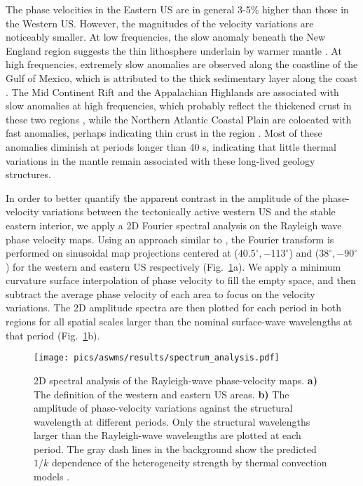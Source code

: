 The phase velocities in the Eastern US are in general 3-5\% higher than those in the Western US. However, the magnitudes of the velocity variations are noticeably smaller. 
At low frequencies, the slow anomaly beneath the New England region suggests the thin lithosphere underlain by warmer mantle \citep[e.g.,][]{Li:2002el,Gaherty:2004is,Rychert:2005cc}.
At high frequencies, extremely slow anomalies are observed along the coastline of the Gulf of Mexico, which is attributed to the thick sedimentary layer along the coast \citep{Laske:1997ug}. The Mid Continent Rift and the Appalachian Highlands are associated with slow anomalies at high frequencies, which probably reflect the thickened crust in these two regions \citep{Crotwell:2005iu,Shen:2013dd,Parker:2013ku}, while the Northern Atlantic Coastal Plain are colocated with fast anomalies, perhaps indicating thin crust in the region \citep{Crotwell:2005iu}. 
Most of these anomalies diminish at periods longer than 40 s, indicating that little thermal variations in the mantle remain associated with these long-lived geology structures. 


In order to better quantify the apparent contrast in the amplitude of the phase-velocity variations between the tectonically active western US and the stable eastern interior, 
we apply a 2D Fourier spectral analysis on the Rayleigh wave phase velocity maps. 
Using an approach similar to \citet{Chevrot:1998hm}, the Fourier transform is performed on sinusoidal map projections centered at ($40.5^\circ,-113^\circ$) and ($38^\circ,-90^\circ$) for the western and eastern US respectively (Fig.~\ref{fig:spectrum_analysis}a). We apply a minimum curvature surface interpolation of phase velocity to fill the empty space, and then subtract the average phase velocity of each area to focus on the velocity variations. The 2D amplitude spectra are then plotted for each period in both regions for all spatial scales larger than the nominal surface-wave wavelengths at that period (Fig.~\ref{fig:spectrum_analysis}b).


\begin{figure}
	\center
	\texttt{[image: pics/aswms/results/spectrum\_analysis.pdf]}
	\caption[2D spectral analysis of the Rayleigh-wave phase-velocity maps.]{2D spectral analysis of the Rayleigh-wave phase-velocity maps. \textbf{a)} The definition of the western and eastern US areas. \textbf{b)} The amplitude of phase-velocity variations against the structural wavelength at different periods. Only the structural wavelengths larger than the Rayleigh-wave wavelengths are plotted at each period. The gray dash lines in the background show the predicted $1/k$ dependence of the heterogeneity strength by thermal convection models \citep[e.g.,][]{Ricard:2014dv}.}
	\label{fig:spectrum_analysis}
\end{figure}



